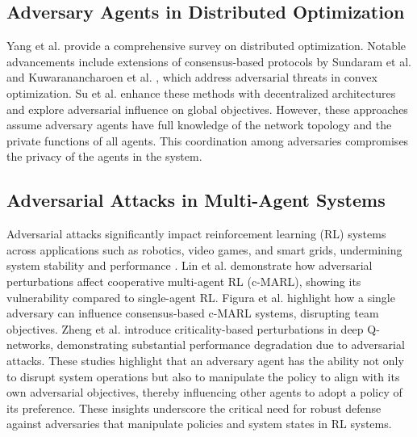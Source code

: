     
\subsection{Adversary Agents in Distributed Optimization}
Yang et al. \cite{yang2019survey} provide a comprehensive survey on distributed optimization. Notable advancements include extensions of consensus-based protocols by Sundaram et al. \cite{sundaram2018distributed} and Kuwaranancharoen et al. \cite{kuwaranancharoen2020byzantine}, which address adversarial threats in convex optimization. Su et al. \cite{su2020byzantine} enhance these methods with decentralized architectures and explore adversarial influence on global objectives. However, these approaches assume adversary agents have full knowledge of the network topology and the private functions of all agents. This coordination among adversaries compromises the privacy of the agents in the system.

\subsection{Adversarial Attacks in Multi-Agent Systems}
Adversarial attacks significantly impact reinforcement learning (RL) systems across applications such as robotics, video games, and smart grids, undermining system stability and performance \cite{guesmi2023physical, ali2023survey}. Lin et al. \cite{lin2020robustness} demonstrate how adversarial perturbations affect cooperative multi-agent RL (c-MARL), showing its vulnerability compared to single-agent RL. Figura et al. \cite{figura2021adversarial} highlight how a single adversary can influence consensus-based c-MARL systems, disrupting team objectives. Zheng et al. \cite{zheng2021vulnerability} introduce criticality-based perturbations in deep Q-networks, demonstrating substantial performance degradation due to adversarial attacks. These studies highlight that an adversary agent has the ability not only to disrupt system operations but also to manipulate the policy to align with its own adversarial objectives, thereby influencing other agents to adopt a policy of its preference. These insights underscore the critical need for robust defense against adversaries that manipulate policies and system states in RL systems.

